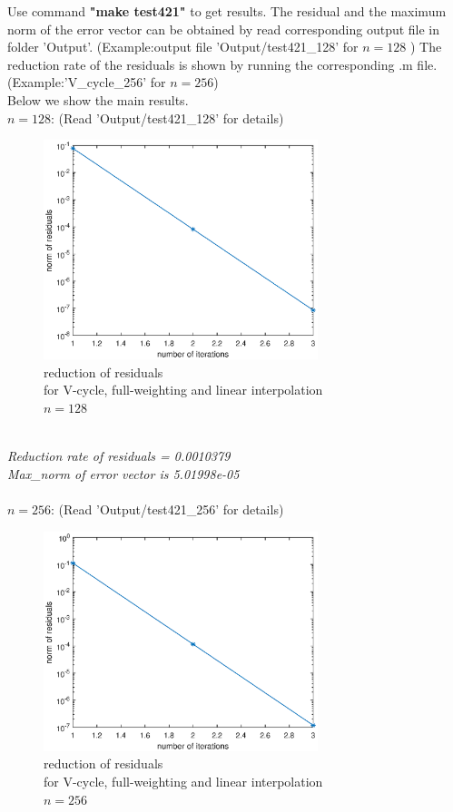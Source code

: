 \documentclass[a4paper,twocolumn]{article}
\theoremstyle{definition}
\begin{document}
Use command \textbf{"make test421"} to get results. The residual and the maximum norm of the error vector can be obtained by read corresponding output file in folder 'Output'. (Example:output file 'Output/test421\_128' for $n = 128$ ) The reduction rate of the residuals is shown by running the corresponding .m file. (Example:'V\_cycle\_256' for $n = 256$)\\
Below we show the main results.\\
\newpage
\noindent $n=128$: (Read 'Output/test421\_128' for details)
\begin{figure}[!htp]   
	\centering
	\includegraphics[width=8cm]{Pictures/F421_1.eps}
	\caption{reduction of residuals \\for V-cycle, full-weighting and linear interpolation\\ $n = 128$}
\end{figure}\\
\emph{Reduction rate of residuals = 0.0010379}\\
\emph{Max\_norm of error vector is 5.01998e-05}\\\\
$n=256$: (Read 'Output/test421\_256' for details)
\begin{figure}[!htp]   
	\centering
	\includegraphics[width=8cm]{Pictures/F421_2.eps}
	\caption{reduction of residuals \\for V-cycle, full-weighting and linear interpolation\\ $n = 256$}
\end{figure}\\
\end{document}
